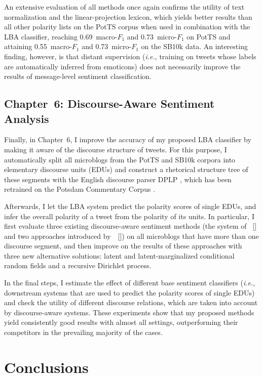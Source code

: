 \documentclass[11pt]{article}
\newcommand{\ienocomma}{\textit{i.e.}}
\newcommand{\ie}{\ienocomma,}
\newcommand{\F}[0]{$F_1$}
\renewcommand{\cite}{\citep}
\begin{document}
An extensive evaluation of all methods once again confirms the utility
of text normalization and the linear-projection lexicon, which yields
better results than all other polarity lists on the PotTS corpus when
used in combination with the LBA classifier, reaching 0.69~macro-\F
and 0.73~micro-\F{} on PotTS and attaining 0.55~macro-\F{} and
0.73~micro-\F{} on the SB10k data.  An interesting finding, however,
is that distant supervision (\ie{} training on tweets whose labels are
automatically inferred from emoticons) does not necessarily improve
the results of message-level sentiment classification.

\subsection{Chapter~6: Discourse-Aware Sentiment Analysis}

Finally, in Chapter~6, I improve the accuracy of my proposed LBA
classifier by making it aware of the discourse structure of tweets.
For this purpose, I automatically split all microblogs from the PotTS
and SB10k corpora into elementary discourse units (EDUs) and construct
a rhetorical structure tree of these segments \cite{Mann:88} with the
English discourse parser DPLP \cite{Ji:14}, which has been retrained
on the Potsdam Commentary Corpus \cite{Stede:14}.

Afterwards, I let the LBA system predict the polarity scores of single
EDUs, and infer the overall polarity of a tweet from the polarity of
its units.  In particular, I first evaluate three existing
discourse-aware sentiment methods (the system of
\citeauthor{Wang:13}~[\citeyear{Wang:13}] and two approaches
introduced by~\citeauthor{Bhatia:15}~[\citeyear{Bhatia:15}]) on all
microblogs that have more than one discourse segment, and then improve
on the results of these approaches with three new alternative
solutions: latent and latent-marginalized conditional random fields
and a recursive Dirichlet process.

In the final steps, I estimate the effect of different base sentiment
classifiers (\ie{} downstream systems that are used to predict the
polarity scores of single EDUs) and check the utility of different
discourse relations, which are taken into account by discourse-aware
systems.  These experiments show that my proposed methods yield
consistently good results with almost all settings, outperforming
their competitors in the prevailing majority of the cases.

\section{Conclusions}
\end{document}
